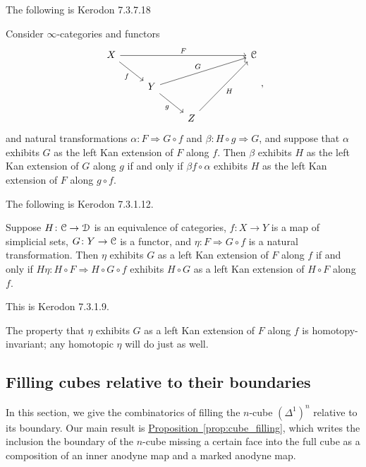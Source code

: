 \documentclass[main.tex]{subfiles}
\begin{document}
The following is Kerodon 7.3.7.18
\begin{proposition}
  \label{prop:kan_extend_along_composition}
  Consider $\infty$-categories and functors
  \begin{equation*}
    \begin{tikzcd}
      X
      \arrow[dr, swap, "f"]
      \arrow[rrrr, "F"]
      &&&& \category{C}
      \\
      & Y
      \arrow[urrr, "G"]
      \arrow[dr, swap, "g"]
      \\
      && Z
      \arrow[uurr, swap, "H"]
    \end{tikzcd},
  \end{equation*}
  and natural transformations $\alpha\colon F \Rightarrow G \circ f$ and $\beta\colon H \circ g \Rightarrow G$, and suppose that $\alpha$ exhibits $G$ as the left Kan extension of $F$ along $f$. Then $\beta$ exhibits $H$ as the left Kan extension of $G$ along $g$ if and only if $\beta f \circ \alpha$ exhibits $H$ as the left Kan extension of $F$ along $g \circ f$.
\end{proposition}

The following is Kerodon 7.3.1.12.
\begin{proposition}
  \label{prop:kan_ext_invariance_of_target}
  Suppose $H\colon \mathcal{C} \to \mathcal{D}$ is an equivalence of categories, $f\colon X \to Y$ is a map of simplicial sets, $G\colon Y \to \mathcal{C}$ is a functor, and $\eta\colon F \Rightarrow G \circ f$ is a natural transformation. Then $\eta$ exhibits $G$ as a left Kan extension of $F$ along $f$ if and only if $H\eta\colon H \circ F \Rightarrow H \circ G \circ f$ exhibits $H \circ G$ as a left Kan extension of $H \circ F$ along $f$.
\end{proposition}

This is Kerodon 7.3.1.9.
\begin{proposition}
  \label{prop:homotopy_invariance_of_witness}
  The property that $\eta$ exhibits $G$ as a left Kan extension of $F$ along $f$ is homotopy-invariant; any homotopic $\eta$ will do just as well. 
\end{proposition}

\subsection{Filling cubes relative to their boundaries}
\label{ssc:filling_cubes_relative_to_their_boundary}

In this section, we give the combinatorics of filling the $n$-cube $(\Delta^{1})^{n}$ relative to its boundary. Our main result is \hyperref[prop:cube_filling]{Proposition~\ref*{prop:cube_filling}}, which writes the inclusion the boundary of the $n$-cube missing a certain face into the full cube as a composition of an inner anodyne map and a marked anodyne map.
\end{document}
